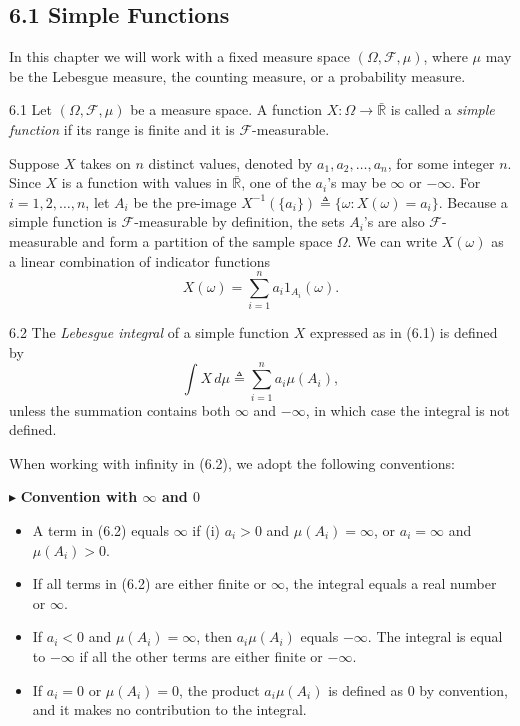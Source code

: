 \subsection*{6.1 Simple Functions}

In this chapter we will work with a fixed measure space $(\Omega,\mathcal{F},\mu)$, where $\mu$ may be the Lebesgue measure, the counting measure, or a probability measure.

\begin{defbox}{6.1}
Let $(\Omega,\mathcal{F},\mu)$ be a measure space. A function $X:\Omega \to \bar{\mathbb{R}}$ is called a \textit{simple function} if its range is finite and it is $\mathcal{F}$-measurable.

Suppose $X$ takes on $n$ distinct values, denoted by $a_1,a_2,\ldots,a_n$, for some integer $n$. Since $X$ is a function with values in $\bar{\mathbb{R}}$, one of the $a_i$'s may be $\infty$ or $-\infty$. For $i=1,2,\ldots,n$, let $A_i$ be the pre-image $X^{-1}(\{a_i\}) \triangleq \{\omega : X(\omega)=a_i\}$. Because a simple function is $\mathcal{F}$-measurable by definition, the sets $A_i$'s are also $\mathcal{F}$-measurable and form a partition of the sample space $\Omega$. We can write $X(\omega)$ as a linear combination of indicator functions
\begin{equation}
X(\omega)=\sum_{i=1}^{n} a_i 1_{A_i}(\omega).
\tag{6.1}
\end{equation}
\end{defbox}

\begin{defbox}{6.2}
The \textit{Lebesgue integral} of a simple function $X$ expressed as in (6.1) is defined by
\begin{equation}
\int X\, d\mu \triangleq \sum_{i=1}^{n} a_i \mu(A_i),
\tag{6.2}
\end{equation}
unless the summation contains both $\infty$ and $-\infty$, in which case the integral is not defined.
\end{defbox}

When working with infinity in (6.2), we adopt the following conventions:

\noindent$\blacktriangleright$ \textbf{Convention with $\infty$ and $0$}
\begin{itemize}
    \item A term in (6.2) equals $\infty$ if (i) $a_i>0$ and $\mu(A_i)=\infty$, or $a_i=\infty$ and $\mu(A_i)>0$.
    \item If all terms in (6.2) are either finite or $\infty$, the integral equals a real number or $\infty$.
    \item If $a_i<0$ and $\mu(A_i)=\infty$, then $a_i\mu(A_i)$ equals $-\infty$. The integral is equal to $-\infty$ if all the other terms are either finite or $-\infty$.
    \item If $a_i=0$ or $\mu(A_i)=0$, the product $a_i\mu(A_i)$ is defined as $0$ by convention, and it makes no contribution to the integral.
\end{itemize}

